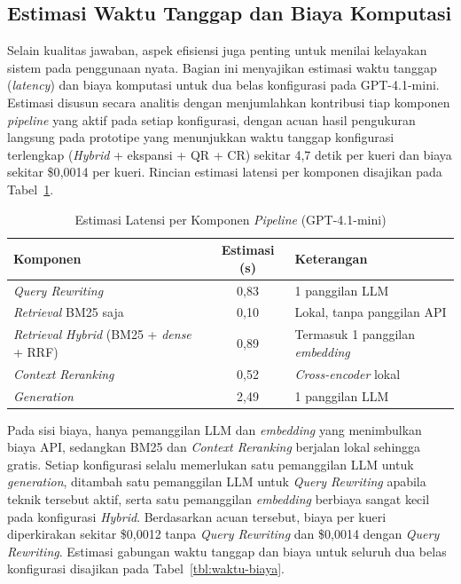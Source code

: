 \subsection{Estimasi Waktu Tanggap dan Biaya Komputasi}
\label{subsec:waktu-biaya}

Selain kualitas jawaban, aspek efisiensi juga penting untuk menilai kelayakan sistem pada penggunaan nyata. Bagian ini menyajikan estimasi waktu tanggap (\textit{latency}) dan biaya komputasi untuk dua belas konfigurasi pada GPT-4.1-mini. Estimasi disusun secara analitis dengan menjumlahkan kontribusi tiap komponen \textit{pipeline} yang aktif pada setiap konfigurasi, dengan acuan hasil pengukuran langsung pada prototipe yang menunjukkan waktu tanggap konfigurasi terlengkap (\textit{Hybrid} + ekspansi + QR + CR) sekitar 4{,}7 detik per kueri dan biaya sekitar \$0{,}0014 per kueri. Rincian estimasi latensi per komponen disajikan pada Tabel~\ref{tbl:latensi-komponen}.

\begin{table}[H]
\centering
\small
\caption{Estimasi Latensi per Komponen \textit{Pipeline} (GPT-4.1-mini)}
\label{tbl:latensi-komponen}
\begin{tabular}{|p{5.5cm}|c|p{5cm}|}
\hline
\textbf{Komponen} & \textbf{Estimasi (s)} & \textbf{Keterangan} \\ \hline
\textit{Query Rewriting}                     & 0{,}83 & 1 panggilan LLM \\ \hline
\textit{Retrieval} BM25 saja                 & 0{,}10 & Lokal, tanpa panggilan API \\ \hline
\textit{Retrieval} \textit{Hybrid} (BM25 + \textit{dense} + RRF) & 0{,}89 & Termasuk 1 panggilan \textit{embedding} \\ \hline
\textit{Context Reranking}                   & 0{,}52 & \textit{Cross-encoder} lokal \\ \hline
\textit{Generation}                          & 2{,}49 & 1 panggilan LLM \\ \hline
\end{tabular}
\end{table}

Pada sisi biaya, hanya pemanggilan LLM dan \textit{embedding} yang menimbulkan biaya API, sedangkan BM25 dan \textit{Context Reranking} berjalan lokal sehingga gratis. Setiap konfigurasi selalu memerlukan satu pemanggilan LLM untuk \textit{generation}, ditambah satu pemanggilan LLM untuk \textit{Query Rewriting} apabila teknik tersebut aktif, serta satu pemanggilan \textit{embedding} berbiaya sangat kecil pada konfigurasi \textit{Hybrid}. Berdasarkan acuan tersebut, biaya per kueri diperkirakan sekitar \$0{,}0012 tanpa \textit{Query Rewriting} dan \$0{,}0014 dengan \textit{Query Rewriting}. Estimasi gabungan waktu tanggap dan biaya untuk seluruh dua belas konfigurasi disajikan pada Tabel~\ref{tbl:waktu-biaya}.

